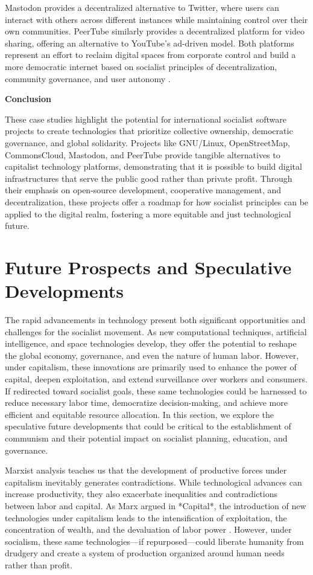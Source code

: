 \begin{refsection}
Mastodon provides a decentralized alternative to Twitter, where users can interact with others across different instances while maintaining control over their own communities. PeerTube similarly provides a decentralized platform for video sharing, offering an alternative to YouTube’s ad-driven model. Both platforms represent an effort to reclaim digital spaces from corporate control and build a more democratic internet based on socialist principles of decentralization, community governance, and user autonomy \cite[pp.~78-83]{klein_decentralized}.

\textbf{Conclusion}

These case studies highlight the potential for international socialist software projects to create technologies that prioritize collective ownership, democratic governance, and global solidarity. Projects like GNU/Linux, OpenStreetMap, CommonsCloud, Mastodon, and PeerTube provide tangible alternatives to capitalist technology platforms, demonstrating that it is possible to build digital infrastructures that serve the public good rather than private profit. Through their emphasis on open-source development, cooperative management, and decentralization, these projects offer a roadmap for how socialist principles can be applied to the digital realm, fostering a more equitable and just technological future.

\section{Future Prospects and Speculative Developments}

The rapid advancements in technology present both significant opportunities and challenges for the socialist movement. As new computational techniques, artificial intelligence, and space technologies develop, they offer the potential to reshape the global economy, governance, and even the nature of human labor. However, under capitalism, these innovations are primarily used to enhance the power of capital, deepen exploitation, and extend surveillance over workers and consumers. If redirected toward socialist goals, these same technologies could be harnessed to reduce necessary labor time, democratize decision-making, and achieve more efficient and equitable resource allocation. In this section, we explore the speculative future developments that could be critical to the establishment of communism and their potential impact on socialist planning, education, and governance.

Marxist analysis teaches us that the development of productive forces under capitalism inevitably generates contradictions. While technological advances can increase productivity, they also exacerbate inequalities and contradictions between labor and capital. As Marx argued in *Capital*, the introduction of new technologies under capitalism leads to the intensification of exploitation, the concentration of wealth, and the devaluation of labor power \cite[pp.~500-505]{marx_capital_vol1}. However, under socialism, these same technologies—if repurposed—could liberate humanity from drudgery and create a system of production organized around human needs rather than profit.


\end{refsection}
